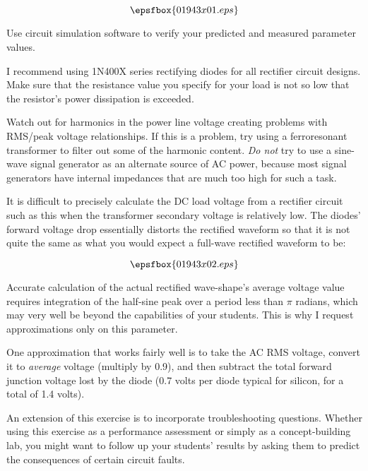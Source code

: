 

$$\epsfbox{01943x01.eps}$$

\vfil \eject






Use circuit simulation software to verify your predicted and measured parameter values.







I recommend using 1N400X series rectifying diodes for all rectifier circuit designs.  Make sure that the resistance value you specify for your load is not so low that the resistor's power dissipation is exceeded.  

Watch out for harmonics in the power line voltage creating problems with RMS/peak voltage relationships.  If this is a problem, try using a ferroresonant transformer to filter out some of the harmonic content.  {\it Do not} try to use a sine-wave signal generator as an alternate source of AC power, because most signal generators have internal impedances that are much too high for such a task.

It is difficult to precisely calculate the DC load voltage from a rectifier circuit such as this when the transformer secondary voltage is relatively low.  The diodes' forward voltage drop essentially distorts the rectified waveform so that it is not quite the same as what you would expect a full-wave rectified waveform to be:

$$\epsfbox{01943x02.eps}$$

Accurate calculation of the actual rectified wave-shape's average voltage value requires integration of the half-sine peak over a period less than $\pi$ radians, which may very well be beyond the capabilities of your students.  This is why I request approximations only on this parameter.

One approximation that works fairly well is to take the AC RMS voltage, convert it to {\it average} voltage (multiply by 0.9), and then subtract the total forward junction voltage lost by the diode (0.7 volts per diode typical for silicon, for a total of 1.4 volts).

An extension of this exercise is to incorporate troubleshooting questions.  Whether using this exercise as a performance assessment or simply as a concept-building lab, you might want to follow up your students' results by asking them to predict the consequences of certain circuit faults.




